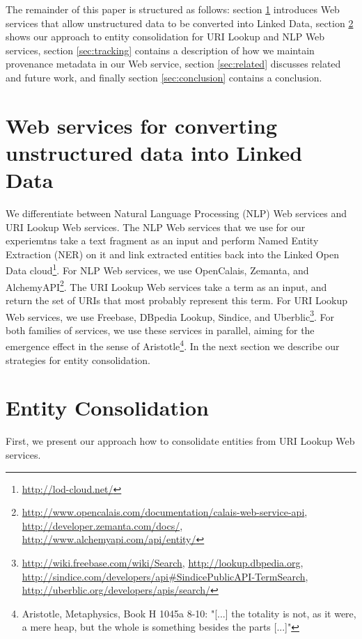 \documentclass{acm_proc_article-sp}
\begin{document}
The remainder of this paper is structured as follows: section \ref{sec:services} introduces Web services that allow unstructured data to be converted into Linked Data, section \ref{sec:consolidation} shows our approach to entity consolidation for URI Lookup and NLP Web services, section \ref{sec:tracking} contains a description of how we maintain provenance metadata in our Web service, section \ref{sec:related} discusses related and future work, and finally section \ref{sec:conclusion} contains a conclusion.

\section{Web services for converting unstructured data into Linked Data}\label{sec:services}
We differentiate between Natural Language Processing (NLP) Web services and URI Lookup Web services. The NLP Web services that we use for our experiemtns take a text fragment as an input and perform Named Entity Extraction (NER) on it and link extracted entities back into the Linked Open Data cloud\footnote{\url{http://lod-cloud.net/}}. For NLP Web services, we use OpenCalais, Zemanta, and AlchemyAPI\footnote{\url{http://www.opencalais.com/documentation/calais-web-service-api}, \url{http://developer.zemanta.com/docs/}, \url{http://www.alchemyapi.com/api/entity/}}. The URI Lookup Web services take a term as an input, and return the set of URIs that most probably represent this term. For URI Lookup Web services, we use Freebase, DBpedia Lookup, Sindice, and Uberblic\footnote{\url{http://wiki.freebase.com/wiki/Search}, \url{http://lookup.dbpedia.org}, \url{http://sindice.com/developers/api#SindicePublicAPI-TermSearch}, \url{http://uberblic.org/developers/apis/search/}}. For both families of services, we use these services in parallel, aiming for the emergence effect in the sense of Aristotle\footnote{Aristotle, Metaphysics, Book H 1045a 8-10: "[...] the totality is not, as it were, a mere heap, but the whole is something besides the parts [...]"}. In the next section we describe our strategies for entity consolidation. 

\section{Entity Consolidation}\label{sec:consolidation}
First, we present our approach how to consolidate entities from URI Lookup Web services.
\end{document}
